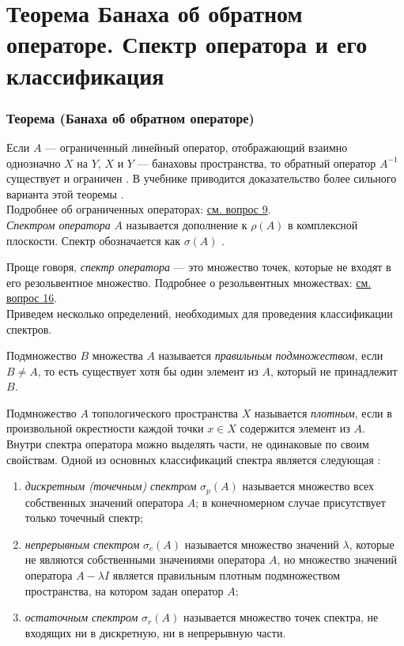 \section{Теорема Банаха об обратном операторе. Спектр оператора и его классификация}
\label{sec:q-17}

\subsubsection*{Теорема (Банаха об обратном операторе)}
Если $A$ --- ограниченный линейный оператор, отображающий взаимно однозначно $X$ на $Y$, $X$ и $Y$ --- банаховы пространства, то обратный оператор $A^{-1}$ существует и ограничен \cite[с.~128]{trenogin}. В учебнике приводится доказательство более сильного варианта этой теоремы \cite[с.~159]{trenogin}.\\
Подробнее об ограниченных операторах: \hyperref[sec:q-9]{см. вопрос 9}.\\

\textit{Спектром оператора} $A$ называется дополнение к $\rho(A)$ в комплексной плоскости. Спектр обозначается как $\sigma(A)$ \cite[с.~248]{trenogin}.

Проще говоря, \textit{спектр оператора} --- это множество точек, которые не входят в его резольвентное множество. Подробнее о резольвентных множествах: \hyperref[sec:q-11]{см. вопрос 16}.\\

Приведем несколько определений, необходимых для проведения классификации спектров.

Подмножество $B$ множества $A$ называется \textit{правильным подмножеством}, если $B \neq A$, то есть существует хотя бы один элемент из $A$, который не принадлежит $B$.

Подмножество $A$ топологического пространства $X$ называется \textit{плотным}, если в произвольной окрестности каждой точки $x \in X$ содержится элемент из $A$.\\

Внутри спектра оператора можно выделять части, не одинаковые по своим свойствам. Одной из основных классификаций спектра является следующая \cite{spectrum-decomposition}:
\begin{enumerate}
	\itemsep0em
	\item \textit{дискретным (точечным) спектром} $\sigma_p(A)$ называется множество всех собственных значений оператора $A$; в конечномерном случае присутствует только точечный спектр;
	\item \textit{непрерывным спектром} $\sigma_c(A)$ называется множество значений $\lambda$, которые не являются собственными значениями оператора $A$, но множество значений оператора $A - \lambda I$ является правильным плотным подмножеством пространства, на котором задан оператор $A$;
	\item \textit{остаточным спектром} $\sigma_r(A)$ называется множество точек спектра, не входящих ни в дискретную, ни в непрерывную части.
\end{enumerate}